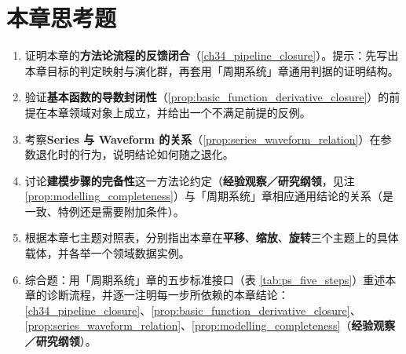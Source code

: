 \section*{本章思考题}

\begin{enumerate}[leftmargin=3em, label=\textbf{题 \arabic*}]
    \item 证明本章的\textbf{方法论流程的反馈闭合}（\ref{ch34_pipeline_closure}）。提示：先写出本章目标的判定映射与演化群，再套用「周期系统」章通用判据的证明结构。

    \item 验证\textbf{基本函数的导数封闭性}（\ref{prop:basic_function_derivative_closure}）的前提在本章领域对象上成立，并给出一个不满足前提的反例。

    \item 考察\textbf{Series 与 Waveform 的关系}（\ref{prop:series_waveform_relation}）在参数退化时的行为，说明结论如何随之退化。

    \item 讨论\textbf{建模步骤的完备性}这一方法论约定（\textbf{经验观察／研究纲领}，见注 \ref{prop:modelling_completeness}）与「周期系统」章相应通用结论的关系（是一致、特例还是需要附加条件）。

    \item 根据本章七主题对照表，分别指出本章在\textbf{平移}、\textbf{缩放}、\textbf{旋转}三个主题上的具体载体，并各举一个领域数据实例。

    \item 综合题：用「周期系统」章的五步标准接口（表 \ref{tab:ps_five_steps}）重述本章的诊断流程，并逐一注明每一步所依赖的本章结论：\ref{ch34_pipeline_closure}、\ref{prop:basic_function_derivative_closure}、\ref{prop:series_waveform_relation}、\ref{prop:modelling_completeness}（\textbf{经验观察／研究纲领}）。
\end{enumerate}


